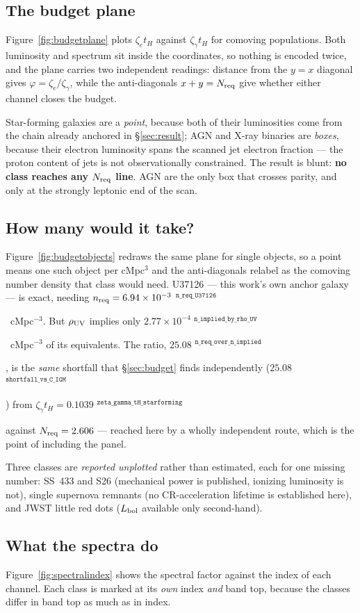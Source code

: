 \documentclass[11pt,a4paper]{article}
\newif\ifprovdraft
\newcommand{\src}[1]{%
  \ifprovdraft
    \ifmmode{}^{\text{\color{gray}\scriptsize\texttt{#1}}}%
    \else{\color{gray}\scriptsize$^{\texttt{#1}}$}%
    \fi
  \fi}
\begin{document}
\subsection{The budget plane}\label{sec:budgetplane}
Figure~\ref{fig:budgetplane} plots $\zeta_e t_H$ against $\zeta_\gamma t_H$ for
comoving populations. Both luminosity and spectrum sit inside the coordinates, so
nothing is encoded twice, and the plane carries two independent readings:
distance from the $y=x$ diagonal gives $\varphi=\zeta_e/\zeta_\gamma$, while the
anti-diagonals $x+y=N_{\rm req}$ give whether either channel closes the budget.

Star-forming galaxies are a \emph{point}, because both of their luminosities come
from the chain already anchored in \S\ref{sec:result}; AGN and X-ray binaries are
\emph{boxes}, because their electron luminosity spans the scanned jet electron
fraction --- the proton content of jets is not observationally constrained. The
result is blunt: \textbf{no class reaches any $N_{\rm req}$ line}. AGN are the only
box that crosses parity, and only at the strongly leptonic end of the scan.

\subsection{How many would it take?}\label{sec:perobject}
Figure~\ref{fig:budgetobjects} redraws the same plane for single objects, so a
point means one such object per cMpc$^3$ and the anti-diagonals relabel as the
comoving number density that class would need. U37126 --- this work's own anchor
galaxy --- is exact, needing
$n_{\rm req}=6.94\times10^{-3}$\src{n\_req\_U37126}~cMpc$^{-3}$. But
$\rho_{\rm UV}$ implies only
$2.77\times10^{-4}$\src{n\_implied\_by\_rho\_UV}~cMpc$^{-3}$ of its equivalents.
The ratio, $25.08$\src{n\_req\_over\_n\_implied}, is the \emph{same}
shortfall that \S\ref{sec:budget} finds independently
($25.08$\src{shortfall\_vs\_C\_IGM}) from
$\zeta_\gamma t_H = 0.1039$\src{zeta\_gamma\_tH\_starforming} against
$N_{\rm req}=2.606$ --- reached here by a wholly independent route, which is the
point of including the panel.

Three classes are \emph{reported unplotted} rather than estimated, each for one
missing number: SS~433 and S26 (mechanical power is published, ionizing luminosity
is not), single supernova remnants (no CR-acceleration lifetime is established
here), and JWST little red dots ($L_{\rm bol}$ available only second-hand).

\subsection{What the spectra do}\label{sec:spectralindex}
Figure~\ref{fig:spectralindex} shows the spectral factor against the index of each
channel. Each class is marked at its \emph{own} index \emph{and} band top, because
the classes differ in band top as much as in index.
\end{document}
